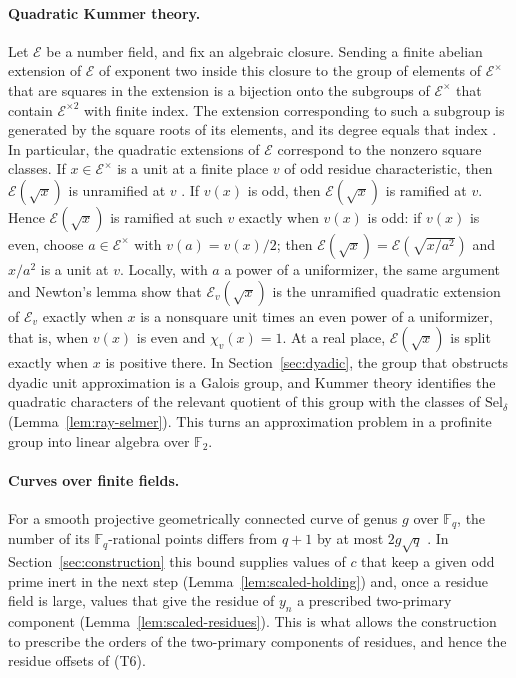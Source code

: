 \documentclass[11pt]{article}
\theoremstyle{plain}
\theoremstyle{definition}
\theoremstyle{remark}
\newcommand{\F}{\mathbb F}
\begin{document}
\paragraph{Quadratic Kummer theory.}  Let $\mathcal E$ be a number field,
and fix an algebraic closure.  Sending a finite
abelian extension of $\mathcal E$ of exponent two inside this closure to
the group of elements of $\mathcal E^\times$ that are squares in the
extension is a bijection onto the subgroups of $\mathcal E^\times$ that
contain $\mathcal E^{\times2}$ with finite index.  The extension
corresponding to such a subgroup is generated by the square roots of its
elements, and its degree equals that index \cite[Chapter~VII, Appendix~A,
Theorem~A.3]{MilneCFT}.  In particular, the quadratic extensions of
$\mathcal E$ correspond to the nonzero square classes.  If
$x\in\mathcal E^\times$ is a unit at a finite place $v$
of odd residue characteristic, then $\mathcal E(\sqrt x)$ is unramified at
$v$ \cite[Chapter~VII, Appendix~A, Proposition~A.5]{MilneCFT}.  If $v(x)$
is odd, then $\mathcal E(\sqrt x)$ is ramified at $v$.  Hence
$\mathcal E(\sqrt x)$ is ramified at such $v$ exactly when $v(x)$ is odd:
if $v(x)$ is even, choose $a\in\mathcal E^\times$ with $v(a)=v(x)/2$;
then $\mathcal E(\sqrt x)=\mathcal E(\sqrt{x/a^2})$ and $x/a^2$ is a unit
at $v$.  Locally, with $a$ a power of a uniformizer, the same argument and
Newton's lemma show that $\mathcal E_v(\sqrt x)$ is the unramified
quadratic extension of $\mathcal E_v$ exactly when $x$ is a nonsquare unit
times an even power of a uniformizer, that is, when $v(x)$ is even and
$\chi_v(x)=1$.  At a real place, $\mathcal E(\sqrt x)$ is split exactly
when $x$ is positive there.  In
Section~\ref{sec:dyadic}, the group that obstructs dyadic unit
approximation is a Galois group, and Kummer theory identifies the
quadratic characters of the relevant quotient of this group with the
classes of $\mathrm{Sel}_\delta$ (Lemma~\ref{lem:ray-selmer}).  This turns an
approximation problem in a profinite group into linear algebra over $\F_2$.

\paragraph{Curves over finite fields.}  For a smooth projective
geometrically connected curve of genus $g$ over $\F_q$, the number of its
$\F_q$-rational points differs from $q+1$ by at most $2g\sqrt q$
\cite[Section~1]{MilneWeil}.  In Section~\ref{sec:construction} this bound
supplies values of $c$ that keep a given odd prime inert in the next step
(Lemma~\ref{lem:scaled-holding}) and, once a residue field is large,
values that give the residue of $y_n$ a prescribed two-primary component
(Lemma~\ref{lem:scaled-residues}).  This is what allows the construction
to prescribe the orders of the two-primary components of residues, and hence the residue offsets of (T6).
\end{document}
